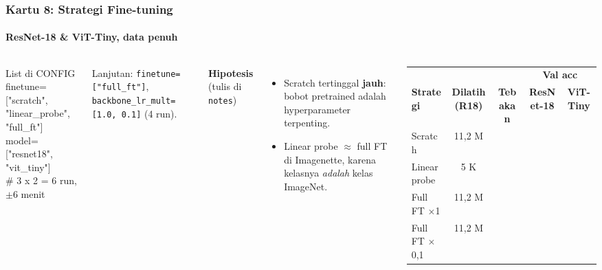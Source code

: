 \documentclass[t,aspectratio=169,xcolor={dvipsnames,table}]{beamer}
\begin{document}
\begin{frame}
    \frametitle{Kartu 8: Strategi Fine-tuning}
    \framesubtitle{ResNet-18 \& ViT-Tiny, data penuh}
    \footnotesize

    \begin{columns}[T]
        \begin{block}{List di CONFIG}
            {\ttfamily\scriptsize finetune=["scratch", "linear\_probe",\\\hspace*{5.0em}"full\_ft"]\\model=["resnet18", "vit\_tiny"]\\\# 3 x 2 = 6 run, $\pm$6 menit}
        \end{block}
        {\scriptsize Lanjutan: \texttt{finetune=["full\_ft"]}, \texttt{backbone\_lr\_mult=[1.0, 0.1]} (4 run).}

        \textbf{Hipotesis} (tulis di \texttt{notes})
        \begin{itemize}
            \item Scratch tertinggal \textbf{jauh}: bobot pretrained adalah hyperparameter terpenting.
            \item Linear probe $\approx$ full FT di Imagenette, karena kelasnya \emph{adalah} kelas ImageNet.
        \end{itemize}

        \vspace{2pt}
        \scriptsize
        \setlength{\tabcolsep}{4pt}
        \renewcommand{\arraystretch}{1.5}
        \begin{tabular}{|l|c|c|c|c|}
            \rowcolor{dlSoftCloud} & & & \multicolumn{2}{c|}{\textbf{Val acc}} \\
            \rowcolor{dlSoftCloud} \textbf{Strategi} & \textbf{Dilatih (R18)} & \textbf{Tebakan} & \textbf{ResNet-18} & \textbf{ViT-Tiny} \\ \hline
            Scratch & 11,2 M & \hspace{0.75cm} & \hspace{0.75cm} & \hspace{0.75cm} \\ \hline
            Linear probe & 5 K & \hspace{0.75cm} & \hspace{0.75cm} & \hspace{0.75cm} \\ \hline
            Full FT $\times$1 & 11,2 M & \hspace{0.75cm} & \hspace{0.75cm} & \hspace{0.75cm} \\ \hline
            Full FT $\times$0,1 & 11,2 M & \hspace{0.75cm} & \hspace{0.75cm} & \hspace{0.75cm} \\ \hline
        \end{tabular}


\end{columns}
\end{frame}
\end{document}
